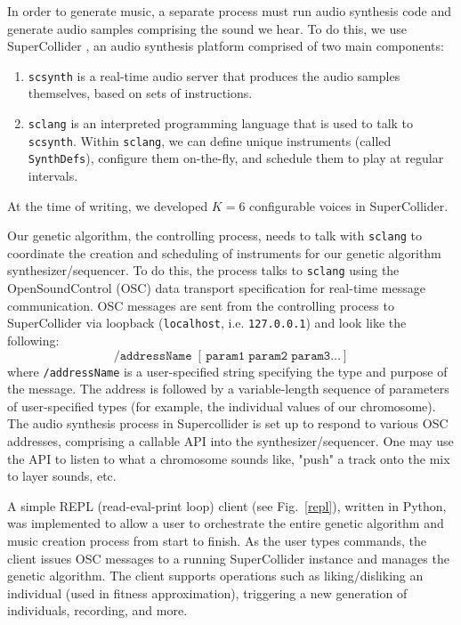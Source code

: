 \documentclass[conference]{IEEEtran}
\begin{document}
In order to generate music, a separate process must run audio synthesis code
and generate audio samples comprising the sound we hear. To do this, we use
SuperCollider \cite{sc}, an audio synthesis platform comprised of
two main components:

\begin{enumerate}
    \item \texttt{scsynth} is a real-time audio server that produces the audio
          samples themselves, based on sets of instructions.
    \item \texttt{sclang} is an interpreted programming language that
          is used to talk to \texttt{scsynth}.  Within \texttt{sclang}, we
          can define unique
          instruments (called \texttt{SynthDefs}), configure them on-the-fly, and
          schedule them
          to play at regular intervals.
\end{enumerate}

At the time of writing, we developed $K=6$ configurable voices
in SuperCollider.

Our genetic algorithm, the controlling process, needs to talk with
\texttt{sclang} to coordinate the creation and scheduling of instruments
for our genetic algorithm synthesizer/sequencer. To do this, the process talks
to \texttt{sclang} using the OpenSoundControl (OSC) data transport
specification \cite{osc} for real-time message communication. OSC
messages are sent from the controlling process to SuperCollider via loopback
(\texttt{localhost}, i.e. \texttt{127.0.0.1}) and look like the
following:
%
\begin{equation}
    \texttt{/addressName}\;[\,\texttt{param1}\;\texttt{param2}\;\texttt{param3}\dots]
\end{equation}
%
where \texttt{/addressName} is a user-specified string specifying the type and
purpose of the message. The address is followed by a variable-length sequence
of parameters of user-specified types (for example, the individual values of
our chromosome). The audio synthesis process in Supercollider is set up to
respond to various OSC addresses, comprising a callable API into the
synthesizer/sequencer. One may use the API to listen to what a chromosome
sounds like, "push" a track onto the mix to layer sounds, etc.

A simple REPL (read-eval-print loop) client (see Fig.~\ref{repl}),
written in Python, was implemented to allow a user to orchestrate the entire
genetic algorithm and music creation process from start to finish. As the user
types commands, the client issues OSC messages to a running SuperCollider
instance and manages the genetic algorithm. The client supports operations such
as liking/disliking an individual (used in fitness approximation), triggering a
new generation of individuals, recording, and more.
\end{document}
